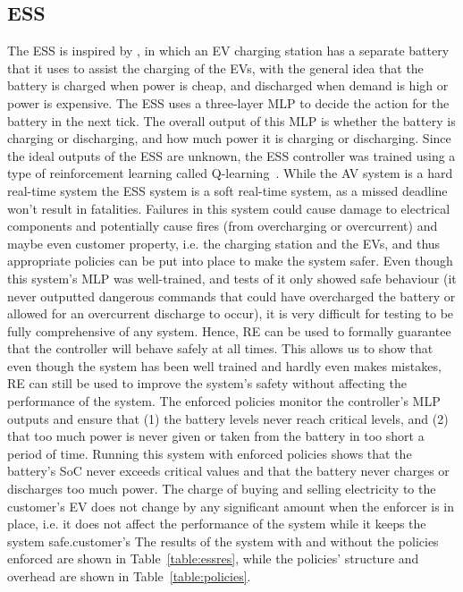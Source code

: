 \subsection{\acf{ESS}} \label{sec:ess4}
The \ac{ESS} is inspired by \cite{chaudhari2017hybrid}, in which an \ac{EV} charging station has a separate battery that it uses to assist the charging of the \acp{EV}, with the general idea that the battery is charged when power is cheap, and discharged when demand is high or power is expensive.
The \ac{ESS} uses a three-layer \ac{MLP} to decide the action for the battery in the next tick.
The overall output of this \ac{MLP} is whether the battery is charging or discharging, and how much power it is charging or discharging.
Since the ideal outputs of the \ac{ESS} are unknown, the \ac{ESS} controller was trained using a type of reinforcement learning called Q-learning~\cite{qlearning2010}.
While the \ac{AV} system is a hard real-time system the \ac{ESS} system is a soft real-time system, as a missed deadline won't result in fatalities.
Failures in this system could cause damage to electrical components and potentially cause fires (from overcharging or overcurrent) and maybe even customer property, i.e. the charging station and the \acp{EV}, and thus appropriate policies can be put into place to make the system safer.
Even though this system's \ac{MLP} was well-trained, and tests of it only showed safe behaviour (it never outputted dangerous commands that could have overcharged the battery or allowed for an overcurrent discharge to occur), it is very difficult for testing to be fully comprehensive of any system.
Hence, \ac{RE} can be used to formally guarantee that the controller will behave safely at all times.
This allows us to show that even though the system has been well trained and hardly even makes mistakes, \ac{RE} can still be used to improve the system's safety without affecting the performance of the system.
The enforced policies monitor the controller's \ac{MLP} outputs and ensure that (1) the battery levels never reach critical levels, and (2) that too much power is never given or taken from the battery in too short a period of time.
Running this system with enforced policies shows that the battery's \ac{SoC} never exceeds critical values and that the battery never charges or discharges too much power.
The charge of buying and selling electricity to the customer's \ac{EV} does not change by any significant amount when the enforcer is in place, i.e. it does not affect the performance of the system while it keeps the system safe.customer's
The results of the system with and without the policies enforced are shown in Table~\ref{table:essres}, while the policies' structure and overhead are shown in Table~\ref{table:policies}.

